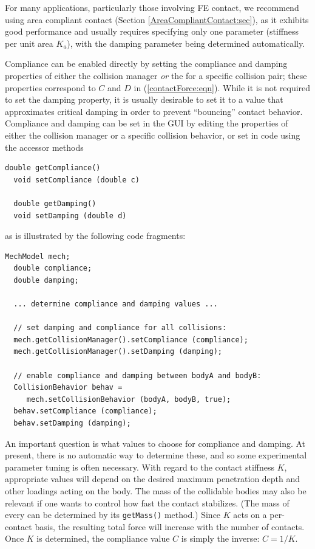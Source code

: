 \begin{sideblock}
For many applications, particularly those involving FE contact, we recommend
using area compliant contact (Section \ref{AreaCompliantContact:sec}), as it
exhibits good performance and usually requires specifying only one parameter
(stiffness per unit area $K_a$), with the damping parameter being determined
automatically.
\end{sideblock}

Compliance can be enabled directly by setting the {\sf compliance} and {\sf
damping} properties of either the collision manager {\it or} the
 for a specific
collision pair; these properties correspond to $C$ and $D$ in
(\ref{contactForce:eqn}). While it is not required to set the damping property,
it is usually desirable to set it to a value that approximates critical damping
in order to prevent ``bouncing'' contact behavior. Compliance and damping can
be set in the GUI by editing the properties of either the collision manager or
a specific collision behavior, or set in code using the accessor methods
%
\begin{lstlisting}[]
  double getCompliance()
  void setCompliance (double c)

  double getDamping()
  void setDamping (double d)
\end{lstlisting}
%
as is illustrated by the following code fragments:
%
\begin{lstlisting}[]
  MechModel mech;
  double compliance;
  double damping;

  ... determine compliance and damping values ...

  // set damping and compliance for all collisions:
  mech.getCollisionManager().setCompliance (compliance);
  mech.getCollisionManager().setDamping (damping);

  // enable compliance and damping between bodyA and bodyB:
  CollisionBehavior behav = 
     mech.setCollisionBehavior (bodyA, bodyB, true);
  behav.setCompliance (compliance);
  behav.setDamping (damping);
\end{lstlisting}
%

An important question is what values to choose for compliance and
damping. At present, there is no automatic way to determine these, and
so some experimental parameter tuning is often necessary. With regard
to the contact stiffness $K$, appropriate values will depend on the
desired maximum penetration depth and other loadings acting on the
body. The mass of the collidable bodies may also be relevant if one
wants to control how fast the contact stabilizes. (The mass of every
 can be
determined by its {\tt getMass()} method.)  Since $K$ acts on a
per-contact basis, the resulting total force will increase with the
number of contacts. Once $K$ is determined, the compliance value $C$
is simply the inverse: $C = 1/K$.

